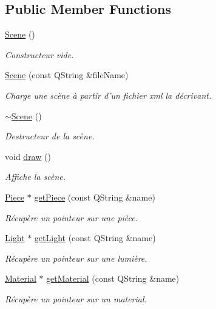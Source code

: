 \subsection*{Public Member Functions}
\begin{DoxyCompactItemize}
\item 
\hyperlink{class_scene_ad10176d75a9cc0da56626f682d083507}{Scene} ()
\begin{DoxyCompactList}\small\item\em Constructeur vide. \end{DoxyCompactList}\item 
\hyperlink{class_scene_a31c9409af2f7f8f592519eb4a3029624}{Scene} (const Q\+String \&file\+Name)
\begin{DoxyCompactList}\small\item\em Charge une scène à partir d'un fichier xml la décrivant. \end{DoxyCompactList}\item 
\hyperlink{class_scene_a3b8cec2e32546713915f8c6303c951f1}{$\sim$\+Scene} ()
\begin{DoxyCompactList}\small\item\em Destructeur de la scène. \end{DoxyCompactList}\item 
void \hyperlink{class_scene_ac0e3d2c98ba6063a086467fb2c19142f}{draw} ()
\begin{DoxyCompactList}\small\item\em Affiche la scène. \end{DoxyCompactList}\item 
\hyperlink{class_piece}{Piece} $\ast$ \hyperlink{class_scene_a8571f97120d3d7826b0689a0e3351f45}{get\+Piece} (const Q\+String \&name)
\begin{DoxyCompactList}\small\item\em Récupère un pointeur sur une pièce. \end{DoxyCompactList}\item 
\hyperlink{class_light}{Light} $\ast$ \hyperlink{class_scene_ae75e1e0573b52c2c960e8afe77fead94}{get\+Light} (const Q\+String \&name)
\begin{DoxyCompactList}\small\item\em Récupère un pointeur sur une lumière. \end{DoxyCompactList}\item 
\hyperlink{class_material}{Material} $\ast$ \hyperlink{class_scene_a6c54f74841e986a80b03866dbed21d33}{get\+Material} (const Q\+String \&name)
\begin{DoxyCompactList}\small\item\em Récupère un pointeur sur un material. \end{DoxyCompactList}\item 

\end{DoxyCompactItemize}
